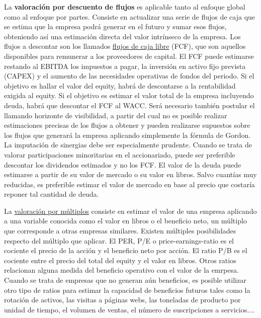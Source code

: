 \documentclass{nuevotema}
\begin{document}
La \textbf{valoración por descuento de flujos} es aplicable tanto al enfoque global como al enfoque por partes. Consiste en actualizar una serie de flujos de caja que se estima que la empresa podrá generar en el futuro y sumar esos flujos, obteniendo así una estimación directa del valor intrínseco de la empresa. Los flujos a descontar son los llamados \underline{flujos de caja libre} (FCF), que son aquellos disponibles para remunerar a los proveedores de capital. El FCF puede estimarse restando al EBITDA los impuestos a pagar, la inversión en activo fijo prevista (CAPEX) y el aumento de las necesidades operativas de fondos del periodo. Si el objetivo es hallar el valor del equity, habrá de descontarse a la rentabilidad exigida al equity. Si el objetivo es estimar el valor total de la empresa incluyendo deuda, habrá que descontar el FCF al WACC. Será necesario también postular el llamando horizonte de visibilidad, a partir del cual no es posible realizar estimaciones precisas de los flujos a obtener y pueden realizarse supuestos sobre los flujos que generará la empresa aplicando simplemente la fórmula de Gordon. La imputación de sinergias debe ser especialmente prudente. Cuando se trata de valorar participaciones minoritarias en el accionariado, puede ser preferible descontar los dividendos estimados y no los FCF. El valor de la deuda puede estimarse a partir de su valor de mercado o su valor en libros. Salvo cuantías muy reducidas, es preferible estimar el valor de mercado en base al precio que costaría reponer tal cantidad de deuda. 

La \underline{valoración por múltiplos} consiste en estimar el valor de una empresa aplicando a una variable conocida como el valor en libros o el beneficio neto, un múltiplo que corresponde a otras empresas similares. Existen múltiples posibilidades respecto del múltiplo que aplicar. El PER, P/E o price-earnings-ratio es el cociente el precio de la acción y el beneficio neto por acción. El ratio P/B es el cociente entre el precio del total del equity y el valor en libros. Otros ratios relacionan alguna medida del beneficio operativo con el valor de la emrpesa. Cuando se trata de empresas que no generan aún beneficios, es posible utilizar otro tipo de ratios para estimar la capacidad de beneficios futuros tales como la rotación de activos, las visitas a páginas webs, las toneladas de producto por unidad de tiempo, el volumen de ventas, el número de suscripciones a servicios....
\end{document}
